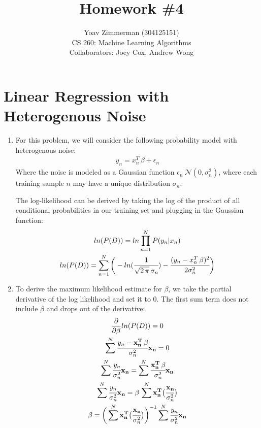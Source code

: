 \documentclass[12pt]{article}
\begin{document}
\title{Homework \#4}
\author{Yoav Zimmerman (304125151) \\
	    CS 260: Machine Learning Algorithms \\
	   Collaborators: Joey Cox, Andrew Wong}
\maketitle

\section{Linear Regression with Heterogenous Noise}
\begin{enumerate}[label=\alph*.]
	\item For this problem, we will consider the following probability model with heterogenous noise:
	\begin{gather*}
		y_n = x_n^T \, \beta + \epsilon_n
	\end{gather*}
	Where the 	noise is modeled as a Gaussian function $\epsilon_n ~ \mathcal{N}(0, \sigma_n^2)$, where each training sample $n$ may have a unique distribution $\sigma_n$.

	The log-likelihood can be derived by taking the log of the product of all conditional probabilities in our training set and plugging in the Gaussian function:
	\begin{gather*}
		ln(P(D)) = ln \prod_{n=1}^{N}{ P(y_n | x_n) } \\
		ln(P(D)) = \sum_{n=1}^N{ \bigg( - ln( \cfrac{1}{\sqrt{2 \, \pi} \, \sigma_n} ) - \cfrac{ (y_n - x_n^T \, \beta)^2 }{ 2 \sigma_n^2 } \bigg) } \\
    	\end{gather*} 

	\item To derive the maximum likelihood estimate for $\beta$, we take the partial derivative of the log likelihood and set it to 0. The first sum term does not include $\beta$ and drops out of the derivative:
	\begin{gather*}
		\frac{\partial}{\partial \mathbf{\beta}} ln (P (D)) = 0 \\
		\sum^N{ \cfrac{ y_n - \mathbf{x_n^T} \, \mathbf{\beta} }{ \sigma_n^2 } \mathbf{x_n} } = 0 \\
		\sum^N{ \cfrac{ y_n }{ \sigma_n^2 } \mathbf{x_n} } = \sum^N{ \cfrac{ \mathbf{x_n^T} \, \mathbf{\beta} }{ \sigma_n^2 } \mathbf{x_n} } \\
		\sum^N{ \cfrac{ y_n }{ \sigma_n^2 } \mathbf{x_n} } = \mathbf{\beta} \, \sum^N{ \mathbf{x_n^T} \big( \cfrac{\mathbf{x_n}}{ \sigma_n^2 } \big) }\\
		\mathbf{\beta} = \bigg( \sum^N{ \mathbf{x_n^T} \big( \cfrac{\mathbf{x_n}}{ \sigma_n^2 } \big) } \bigg)^{-1} \sum^N{ \cfrac{ y_n }{ \sigma_n^2 } \mathbf{x_n} }
	\end{gather*}
\end{enumerate}
\end{document}
